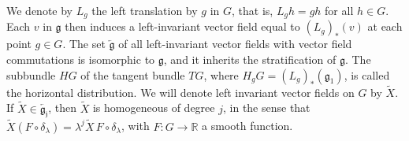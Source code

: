 \documentclass[12pt]{amsart}
\newtheorem{lemma}{Lemma}[section]
\begin{document}


We denote by $L_g$ the left translation by $g$ in $G$, that is, $L_g h = g h$ for all $h\in G$.
Each $v$ in $\mathfrak{g}$ then induces a left-invariant vector field  equal to $(L_g)_*(v)$ at each point $g \in G$.
The set $\overleftarrow{{\mathfrak{g}}}$ of all left-invariant vector fields with vector field commutations is isomorphic to $\mathfrak{g}$, and it inherits the  stratification of $\mathfrak{g}$.
The subbundle  $H  G$ of the tangent bundle $TG$, where $H_gG= (L_g)_*(\mathfrak{g}_{1})$, is called the {horizontal distribution}. 
We will denote left invariant vector fields on $G$ by $\tilde X$. 
If $\tilde X\in \overleftarrow{{\mathfrak{g_j}}}$, then $\tilde X$ is homogeneous of degree $j$, in the sense that $\tilde X(F\circ \delta_\lambda)=\lambda^{j} \tilde X \, F\circ \delta_\lambda$, with $F:G\to \mathbb R$ a smooth function.
\end{document}
